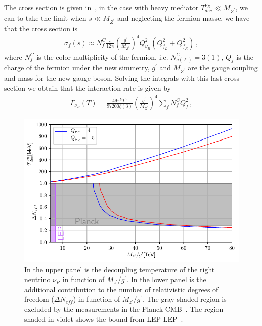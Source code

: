 \documentclass[12pt]{article}
\begin{document}
The cross section is given in~\cite{Barger:2003zh}, in the case with heavy mediator $T^{\nu_R}_{dec} \ll M_{Z^{\prime}}$, we can to take the limit when $s \ll M_{Z^{\prime}}$ and neglecting the fermion masse, we have that the cross section is
%
\begin{align*}
    \sigma_{f}(s) \approx N^{C}_{f} \frac{s}{12 \pi} \left( \frac{g^{\prime}}{M_{Z^{\prime}}} \right)^{4} Q^{2}_{\nu_R} (Q^{2}_{f_L} + Q^{2}_{f_R})\,,
\end{align*}
%
where $N^{C}_{f}$ is the color multiplicity of the fermion, i.e. $N^{C}_{q(\ell)} = 3(1)$, $Q_{f}$ is the charge of the fermion under the new simmetry, $g^{\prime}$ and $M_{Z^{\prime}}$ are the gauge coupling and mass for the new gauge boson. Solving the integrals with this last cross section we obtain that the interaction rate is given by
%
\begin{align*}
    \Gamma_{\nu_{R}}(T) = \frac{49 \pi^{5} T^{5}}{97200 \zeta(3)} \left( \frac{g^{\prime}}{M_{Z^{\prime}}} \right)^{4} \sum_{f} N^{C}_{f} Q^{2}_{f}\,,
\end{align*}
%
%
\begin{figure}
\centering
\includegraphics[scale=0.8]{Figures/DeltaNeff.pdf}
\caption{In the upper panel is the decoupling temperature of the right neutrino $\nu_{R}$ in function of $M_{z^{\prime}}/g^{\prime}$. In the lower panel is the additional contribution to the number of relativistic degrees of freedom ($\Delta N_{eff}$) in function of $M_{z^{\prime}}/g^{\prime}$. The gray shaded region is excluded by the measurements in the Planck CMB~\cite{Aghanim:2018eyx}. The region shaded in violet shows the bound from LEP  LEP~\cite{Alioli:2017nzr}.}
\label{fig:Neff}
\end{figure}
\end{document}
